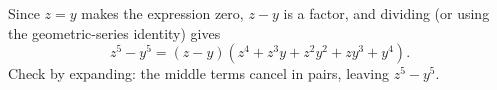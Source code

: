 Since $z=y$ makes the expression zero, $z-y$ is a factor, and dividing (or using the geometric-series identity) gives
\[
z^5-y^5=\boxed{(z-y)\left(z^4+z^3y+z^2y^2+zy^3+y^4\right)}.
\]
Check by expanding: the middle terms cancel in pairs, leaving $z^5-y^5$.

